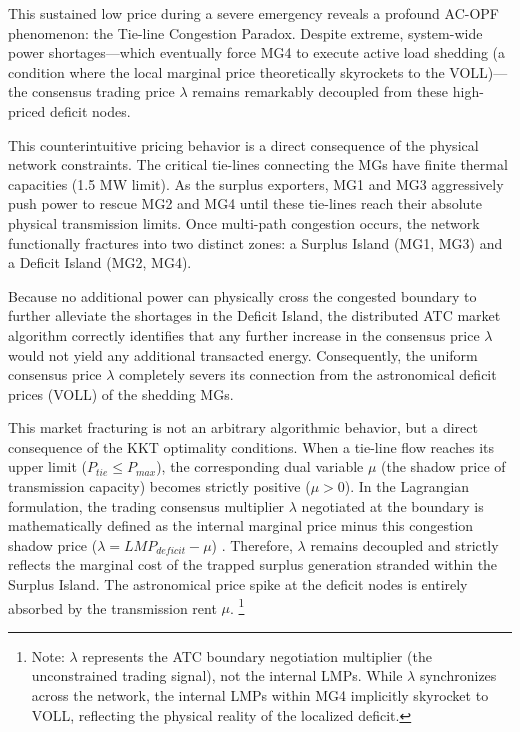 This sustained low price during a severe emergency reveals a profound AC-OPF phenomenon: the Tie-line Congestion Paradox. Despite extreme, system-wide power shortages---which eventually force MG4 to execute active load shedding (a condition where the local marginal price theoretically skyrockets to the VOLL)---the consensus trading price $\lambda$ remains remarkably decoupled from these high-priced deficit nodes. 

This counterintuitive pricing behavior is a direct consequence of the physical network constraints. The critical tie-lines connecting the MGs have finite thermal capacities (1.5 MW limit). As the surplus exporters, MG1 and MG3 aggressively push power to rescue MG2 and MG4 until these tie-lines reach their absolute physical transmission limits. Once multi-path congestion occurs, the network functionally fractures into two distinct zones: a Surplus Island (MG1, MG3) and a Deficit Island (MG2, MG4).

Because no additional power can physically cross the congested boundary to further alleviate the shortages in the Deficit Island, the distributed ATC market algorithm correctly identifies that any further increase in the consensus price $\lambda$ would not yield any additional transacted energy. Consequently, the uniform consensus price $\lambda$ completely severs its connection from the astronomical deficit prices (VOLL) of the shedding MGs.

This market fracturing is not an arbitrary algorithmic behavior, but a direct consequence of the KKT optimality conditions. When a tie-line flow reaches its upper limit ($P_{tie} \le P_{max}$), the corresponding dual variable $\mu$ (the shadow price of transmission capacity) becomes strictly positive ($\mu > 0$). In the Lagrangian formulation, the trading consensus multiplier $\lambda$ negotiated at the boundary is mathematically defined as the internal marginal price minus this congestion shadow price ($\lambda = LMP_{deficit} - \mu$) \cite{Ullah2022_LMP}. Therefore, $\lambda$ remains decoupled and strictly reflects the marginal cost of the trapped surplus generation stranded within the Surplus Island. The astronomical price spike at the deficit nodes is entirely absorbed by the transmission rent $\mu$. \footnote{Note: $\lambda$ represents the ATC boundary negotiation multiplier (the unconstrained trading signal), not the internal LMPs. While $\lambda$ synchronizes across the network, the internal LMPs within MG4 implicitly skyrocket to VOLL, reflecting the physical reality of the localized deficit.}

